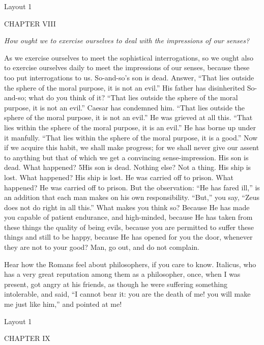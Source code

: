 

Layout 1

CHAPTER VIII

\emph{How ought we to exercise ourselves to deal with the impressions of our senses?}

As we exercise ourselves to meet the sophistical interrogations, so we ought also to exercise ourselves daily to meet the impressions of our senses, because these too put interrogations to us. So-and-so's son is dead. Answer, ``That lies outside the sphere of the moral purpose, it is not an evil.'' His father has disinherited So-and-so; what do you think of it? ``That lies outside the sphere of the moral purpose, it is not an evil.'' Caesar has condemned him. ``That lies outside the sphere of the moral purpose, it is not an evil.'' He was grieved at all this. ``That lies within the sphere of the moral purpose, it is an evil.'' He has borne up under it manfully. ``That lies within the sphere of the moral purpose, it is a good.'' Now if we acquire this habit, we shall make progress; for we shall never give our assent to anything but that of which we get a convincing sense-impression. His son is dead. What happened? 5His son is dead. Nothing else? Not a thing. His ship is lost. What happened? His ship is lost. He was carried off to prison. What happened? He was carried off to prison. But the observation: ``He has fared ill,'' is an addition that each man makes on his own responsibility. ``But,'' you say, ``Zeus does not do right in all this.'' What makes you think so? Because He has made you capable of patient endurance, and high-minded, because He has taken from these things the quality of being evils, because you are permitted to suffer these things and still to be happy, because He has opened for you the door, whenever they are not to your good? Man, go out, and do not complain.

Hear how the Romans feel about philosophers, if you care to know. Italicus, who has a very great reputation among them as a philosopher, once, when I was present, got angry at his friends, as though he were suffering something intolerable, and said, ``I cannot bear it: you are the death of me! you will make me just like him,'' and pointed at me!



Layout 1

CHAPTER IX

